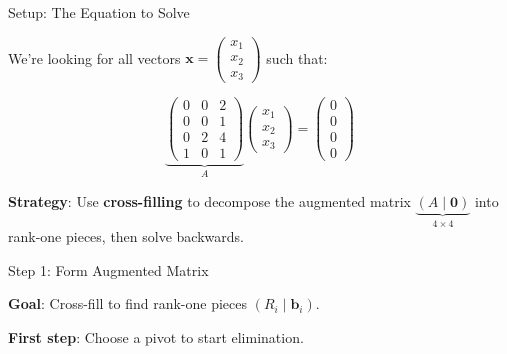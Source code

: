 \documentclass[10pt]{beamer}
\theoremstyle{definition}
\newcommand{\x}[1]{\alert{\textbf{#1}}}
\begin{document}
\begin{frame}{Setup: The Equation to Solve}

We're looking for all vectors $\mathbf{x} = \begin{pmatrix} x_1 \\ x_2 \\ x_3 \end{pmatrix}$ such that:

$$\underbrace{\begin{pmatrix}
0 & 0 & 2 \\
0 & 0 & 1 \\
0 & 2 & 4 \\
1 & 0 & 1
\end{pmatrix}}_{A} \begin{pmatrix} x_1 \\ x_2 \\ x_3 \end{pmatrix} = \begin{pmatrix} 0 \\ 0 \\ 0 \\ 0 \end{pmatrix}$$

\vspace{1em}

\x{Strategy}: Use \textbf{cross-filling} to decompose the augmented matrix $\underbrace{(A \mid \mathbf{0})}_{4 \times 4}$ into rank-one pieces, then solve backwards.

\end{frame}

\begin{frame}[fragile]{Step 1: Form Augmented Matrix}

\begin{center}
\end{center}

\vspace{1em}

\x{Goal}: Cross-fill to find rank-one pieces $(R_i \mid \mathbf{b}_i)$.

\vspace{0.5em}

\x{First step}: Choose a pivot to start elimination.

\end{frame}
\end{document}
